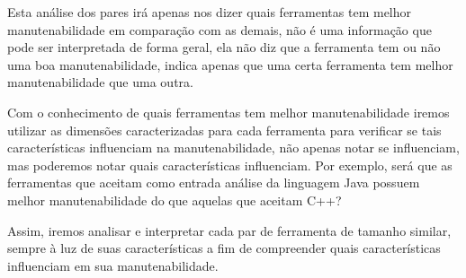 Esta análise dos pares irá apenas nos dizer quais ferramentas tem melhor
manutenabilidade em comparação com as demais, não é uma informação que
pode ser interpretada de forma geral, ela não diz que a ferramenta tem
ou não uma boa manutenabilidade, indica apenas que uma certa ferramenta
tem melhor manutenabilidade que uma outra.

Com o conhecimento de quais ferramentas tem melhor manutenabilidade iremos
utilizar as dimensões caracterizadas para cada ferramenta para verificar se
tais características influenciam na manutenabilidade, não apenas notar se
influenciam, mas poderemos notar quais características influenciam. Por
exemplo, será que as ferramentas que aceitam como entrada análise da linguagem
Java possuem melhor manutenabilidade do que aquelas que aceitam C++?

Assim, iremos analisar e interpretar cada par de ferramenta de tamanho
similar, sempre à luz de suas características a fim de compreender quais
características influenciam em sua manutenabilidade.

%
